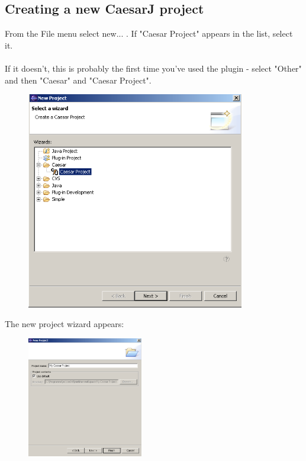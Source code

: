 
\subsection{Creating a new CaesarJ project}
From the File menu select new... . If "Caesar Project" appears
in the list, select it.\\\\
If it doesn't, this is probably the first time you've used the plugin - select "Other" and then "Caesar" and "Caesar Project".
\begin{figure}[htbp]
	\centering
		\includegraphics[width=0.85\textwidth]{images/project_wizard.png}
	\label{fig:project_wizard}
\end{figure}\newpage

The new project wizard appears:
\begin{figure}[htbp]
	\centering
		\includegraphics[width=0.45\textwidth]{images/project_wizard2.png}
	\label{fig:project_wizard2}
\end{figure}

